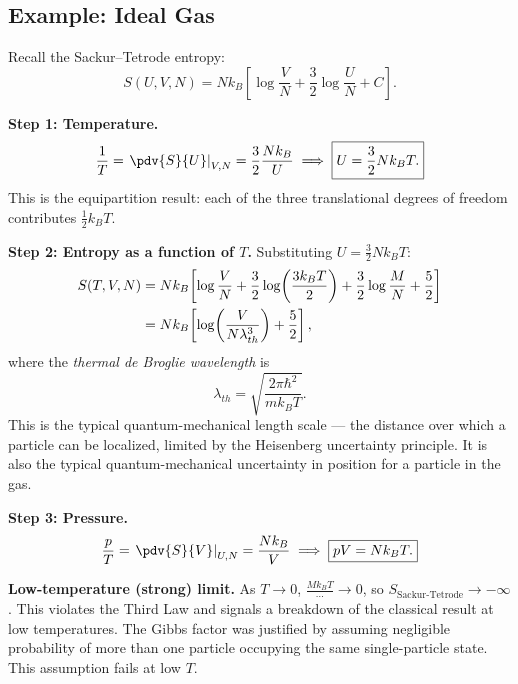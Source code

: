 \subsection{Example: Ideal Gas}

Recall the Sackur--Tetrode entropy:
\begin{equation}
    S(U, V, N) = Nk_B \left[\log\frac{V}{N} + \frac{3}{2}\log\frac{U}{N} + C\right].
\end{equation}

\textbf{Step 1: Temperature.}
\begin{equation}
    \frac{1}{T} = \left.\pdv{S}{U}\right|_{V, N} = \frac{3}{2}\frac{Nk_B}{U}
    \implies \boxed{U = \frac{3}{2}Nk_B T.}
\end{equation}
This is the equipartition result: each of the three translational degrees of freedom contributes $\frac{1}{2}k_BT$.

\textbf{Step 2: Entropy as a function of $T$.} Substituting $U = \frac{3}{2}Nk_BT$:
\begin{align}
    S(T, V, N) &= Nk_B\!\left[\log\frac{V}{N} + \frac{3}{2}\log\!\left(\frac{3k_B T}{2}\right) + \frac{3}{2}\log\frac{M}{N} + \frac{5}{2}\right] \notag \\
    &= Nk_B\!\left[\log\!\left(\frac{V}{N\lambda_{th}^3}\right) + \frac{5}{2}\right],
\end{align}
where the \emph{thermal de Broglie wavelength} is
\begin{equation}
    \lambda_{th} = \sqrt{\frac{2\pi\hbar^2}{mk_BT}}.
\end{equation}
This is the typical quantum-mechanical length scale --- the distance over which a particle can be localized, limited by the Heisenberg uncertainty principle. It is also the typical quantum-mechanical uncertainty in position for a particle in the gas.

\textbf{Step 3: Pressure.}
\begin{equation}
    \frac{p}{T} = \left.\pdv{S}{V}\right|_{U, N} = \frac{Nk_B}{V}
    \implies \boxed{pV = Nk_B T.}
\end{equation}

\textbf{Low-temperature (strong) limit.} As $T\to 0$, $\frac{Mk_BT}{\cdots}\to 0$, so $S_\text{Sackur-Tetrode}\to -\infty$. This violates the Third Law and signals a breakdown of the classical result at low temperatures. The Gibbs factor was justified by assuming negligible probability of more than one particle occupying the same single-particle state. This assumption fails at low $T$.

